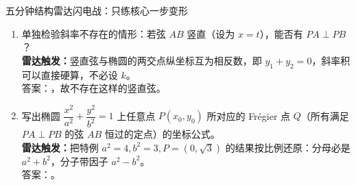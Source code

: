 \begin{warmupbox}{五分钟结构雷达闪电战：只练核心一步变形}
\begin{enumerate}[label=(\arabic*), itemsep=5pt]
\item 单独检验斜率不存在的情形：若弦 $AB$ 竖直（设为 $x=t$），能否有 $PA\perp PB$？\\
{\small\bfseries\textcolor{third}{雷达触发：}}竖直弦与椭圆的两交点纵坐标互为相反数，即 $y_1+y_2=0$，斜率积可以直接硬算，不必设 $k$。\\
答案：，故不存在这样的竖直弦。

\item 写出椭圆 $\dfrac{x^2}{a^2}+\dfrac{y^2}{b^2}=1$ 上任意点 $P(x_0,y_0)$ 所对应的 Frégier 点 $Q$（所有满足 $PA\perp PB$ 的弦 $AB$ 恒过的定点）的坐标公式。\\
{\small\bfseries\textcolor{third}{雷达触发：}}把特例 $a^2=4,b^2=3,P=(0,\sqrt3)$ 的结果按比例还原：分母必是 $a^2+b^2$，分子带因子 $a^2-b^2$。\\
答案：。
\end{enumerate}
\end{warmupbox}


